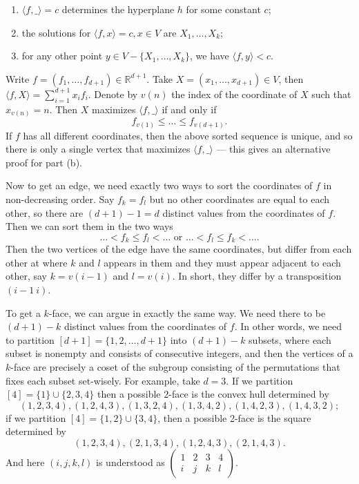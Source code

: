 \documentclass[12pt,reqno]{amsart}
\theoremstyle{definition}
\newcommand{\RR}{\mathbb{R}}
\newcommand{\la}{\langle}
\newcommand{\ra}{\rangle}
\begin{document}
\begin{enumerate}
  \item $\la f, \_ \ra=c$  determines the hyperplane $h$ for some constant $c$;
  \item the solutions for $\la f, x \ra = c, x\in V$ are $X_1,\dots, X_k$;
  \item for any other point $y\in V-\{X_1,\dots, X_k\}$, we have $\la f, y \ra <c$.
\end{enumerate}

Write $f=(f_1,\dots,f_{d+1})\in  \RR^{d+1}$. Take $X=(x_1,\dots,x_{d+1})\in V$, then $\la f, X\ra =  \sum_{i=1}^{d+1}x_i f_{i} $. Denote by $v(n)$ the index of the coordinate of $X$ such that $x_{v(n)}=n$. Then $X$ maximizes $\la f, \_ \ra$ if and only if $$f_{v(1)}\leq \dots\leq f_{v(d+1)}.$$ If $f$ has all different coordinates, then the above sorted sequence is unique, and so there is only a single vertex that maximizes $\la f, \_ \ra$ --- this gives an alternative proof for part (b).

Now to get an edge, we need exactly two ways to sort the coordinates of $f$ in non-decreasing order.  Say $f_k=f_l$ but no other coordinates are equal to each other, so there are $(d+1)-1=d$ distinct values from the coordinates of $f$. Then we can sort them in the two ways
$$\dots < f_k\leq f_l<\dots \mbox{ or } \dots < f_l\leq f_k<\dots.$$
Then the two vertices of the edge have the same coordinates, but differ from each other at where $k$ and $l$ appears in them and they must appear adjacent to each other, say $k=v(i-1)$ and $l=v(i)$. In short, they differ by a transposition $(i-1\: i)$.


To get a $k$-face, we can argue in exactly the same way. We need there to be $(d+1)-k$ distinct values from the coordinates of $f$. In other words, we need to partition $[d+1]=\{1,2,\dots,d+1\}$ into $(d+1)-k$ subsets, where each subset is nonempty and consists of consecutive integers, and then the vertices of a $k$-face are precisely a coset of the subgroup consisting of the permutations that fixes each subset set-wisely. For example, take $d=3$. If we partition $[4]=\{1\}\cup \{2,3,4\}$ then a possible $2$-face is the convex hull determined by $$(1,2,3,4),(1,2,4,3),(1,3,2,4),(1,3,4,2),(1,4,2,3),(1,4,3,2);$$ if we partition $[4]=\{1,2\}\cup \{3,4\}$, then a possible 2-face is the square determined by $$(1,2,3,4),(2,1,3,4),(1,2,4,3),(2,1,4,3).$$ And here $(i,j,k,l)$ is understood as $\begin{pmatrix}
    1 & 2 & 3 & 4 \\
    i & j & k & l
  \end{pmatrix}.$
\end{document}
